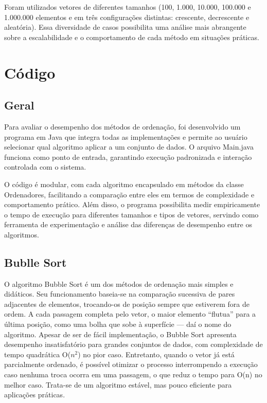 \documentclass[
	article,			%
	11pt,				%
	oneside,			%
	a4paper,			%
	english,			%
	brazil,				%
	sumario=tradicional
	]{abntex2}
\begin{document}
Foram utilizados vetores de diferentes tamanhos (100, 1.000, 10.000, 100.000 e 1.000.000 elementos e em três configurações distintas: crescente, decrescente e aleatória). Essa diversidade de casos possibilita uma análise mais abrangente sobre a escalabilidade e o comportamento de cada método em situações práticas.

\section{Código}
\subsection{Geral}
Para avaliar o desempenho dos métodos de ordenação, foi desenvolvido um programa em Java que integra todas as implementações e permite ao usuário selecionar qual algoritmo aplicar a um conjunto de dados. O arquivo Main.java funciona como ponto de entrada, garantindo execução padronizada e interação controlada com o sistema.

O código é modular, com cada algoritmo encapsulado em métodos da classe Ordenadores, facilitando a comparação entre eles em termos de complexidade e comportamento prático. Além disso, o programa possibilita medir empiricamente o tempo de execução para diferentes tamanhos e tipos de vetores, servindo como ferramenta de experimentação e análise das diferenças de desempenho entre os algoritmos.

\subsection{Bublle Sort}
O algoritmo Bubble Sort é um dos métodos de ordenação mais simples e didáticos. Seu funcionamento baseia-se na comparação sucessiva de pares adjacentes de elementos, trocando-os de posição sempre que estiverem fora de ordem. A cada passagem completa pelo vetor, o maior elemento “flutua” para a última posição, como uma bolha que sobe à superfície — daí o nome do algoritmo.
Apesar de ser de fácil implementação, o Bubble Sort apresenta desempenho insatisfatório para grandes conjuntos de dados, com complexidade de tempo quadrática O($n^2$) no pior caso. Entretanto, quando o vetor já está parcialmente ordenado, é possível otimizar o processo interrompendo a execução caso nenhuma troca ocorra em uma passagem, o que reduz o tempo para O(n) no melhor caso. Trata-se de um algoritmo estável, mas pouco eficiente para aplicações práticas.
    
\end{document}
